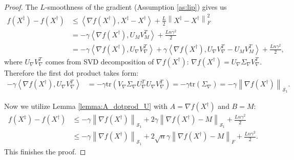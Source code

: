 \documentclass{article}
\theoremstyle{plain}
\theoremstyle{definition}
\theoremstyle{remark}
\newcommand{\norm}[1]{\left\| #1 \right\|}
\newcommand{\dotprod}[2]{\left\langle #1,#2 \right\rangle}
\begin{document}
    \begin{proof}
        The $L$-smoothness of the gradient (Assumption \ref{as:lip}) gives us 
        \begin{align*}
            f\left( X^\ddagger \right) - f\left( X^\dagger \right)
            &\leq
            \dotprod{\nabla f\left( X^\dagger \right)}{X^\ddagger - X^\dagger}
            +
            \frac{L}{2} \norm{X^\ddagger - X^\dagger}_F^2
            \\&=
            -\gamma \dotprod{\nabla f\left( X^\dagger \right)}{U_M V_M^T}
            +
            \frac{L n \gamma^2}{2}
            \\&=
            -\gamma \dotprod{\nabla f\left( X^\dagger \right)}{U_\nabla V_\nabla^T}
            +
            \gamma \dotprod{\nabla f\left( X^\dagger \right)}{U_\nabla V_\nabla^T - U_M V_M^T}
            +
            \frac{L n \gamma^2}{2},
        \end{align*}
        where $U_\nabla V_\nabla^T$ comes from SVD decomposition of $\nabla f\left( X^\dagger \right)$: $\nabla f\left( X^\dagger \right) = U_\nabla \Sigma_\nabla V_\nabla^T$. Therefore the first dot product takes form:
        \begin{align*}
            -\gamma \dotprod{\nabla f\left( X^\dagger \right)}{U_\nabla V_\nabla^T}
            &=
            -\gamma \text{tr} \left( V_\nabla \Sigma_\nabla U_\nabla^T U_\nabla V_\nabla^T\right)
            =
            -\gamma \text{tr} \left( \Sigma_\nabla\right)
            =
            - \gamma \norm{\nabla f\left( X^\dagger \right)}_{\mathcal{S}_1} .
        \end{align*}

        Now we utilize Lemma \ref{lemma:A_dotprod_U} with $A = \nabla f\left( X^\dagger \right)$ and $B = M$:
        \begin{align*}
            f\left( X^\ddagger \right) - f\left( X^\dagger \right)
            &\leq
            -\gamma \norm{\nabla f\left( X^\dagger \right)}_{\mathcal{S}_1}
            +
            2 \gamma \norm{\nabla f\left( X^\dagger \right) - M}_{\mathcal{S}_1}
            +
            \frac{L n \gamma^2}{2}
            \\&\leq
            -\gamma \norm{\nabla f\left( X^\dagger \right)}_{\mathcal{S}_1}
            +
            2 \sqrt{n}\gamma \norm{\nabla f\left( X^\dagger \right) - M}_{F}
            +
            \frac{L n \gamma^2}{2}.
        \end{align*}
        This finishes the proof.
    \end{proof}
\end{document}
